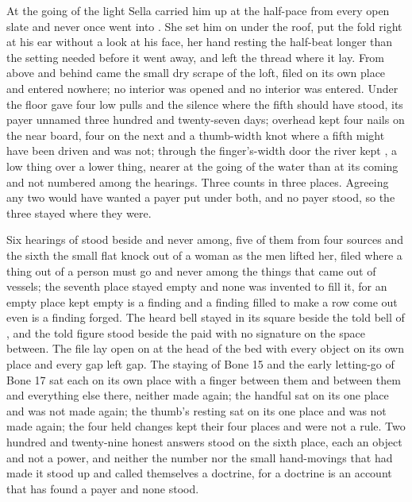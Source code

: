 At the going of the light Sella carried him up at the half-pace from every open slate and never once went into . She set him on  under the roof, put the fold right at his ear without a look at his face, her hand resting the half-beat longer than the setting needed before it went away, and left the thread where it lay. From above and behind came the small dry scrape of the loft, filed on its own place and entered nowhere; no interior was opened and no interior was entered. Under the floor  gave four low pulls and the silence where the fifth should have stood, its payer unnamed three hundred and twenty-seven days; overhead  kept four nails on the near board, four on the next and a thumb-width knot where a fifth might have been driven and was not; through the finger's-width door the river kept , a low thing over a lower thing, nearer at the going of the water than at its coming and not numbered among the hearings. Three counts in three places. Agreeing any two would have wanted a payer put under both, and no payer stood, so the three stayed where they were.

Six hearings of  stood beside and never among, five of them from four sources and the sixth the small flat knock out of a woman as the men lifted her, filed where a thing out of a person must go and never among the things that came out of vessels; the seventh place stayed empty and none was invented to fill it, for an empty place kept empty is a finding and a finding filled to make a row come out even is a finding forged. The heard bell stayed in its square beside the told bell of , and the told figure stood beside the paid with no signature on the space between. The file lay open on  at the head of the bed with every object on its own place and every gap left gap. The staying of Bone 15 and the early letting-go of Bone 17 sat each on its own place with a finger between them and between them and everything else there, neither made again; the handful sat on its one place and was not made again; the thumb's resting sat on its one place and was not made again; the four held changes kept their four places and were not a rule. Two hundred and twenty-nine honest answers stood on the sixth place, each an object and not a power, and neither the number nor the small hand-movings that had made it stood up and called themselves a doctrine, for a doctrine is an account that has found a payer and none stood.

